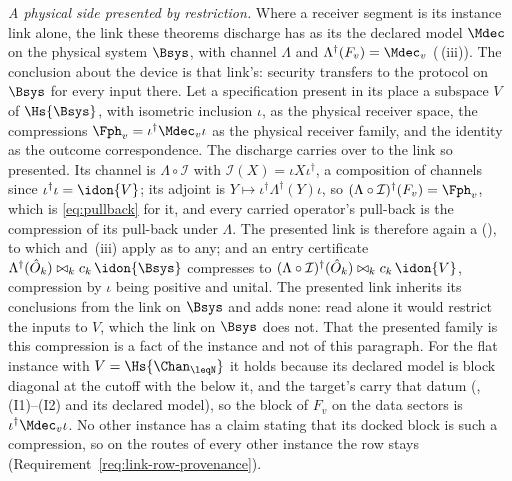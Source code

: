 \begin{remark}
\emph{A physical side presented by restriction.} Where a receiver segment is
its instance link alone, the link these theorems discharge has as its
 the declared model $\Mdec$ on the physical system
$\Bsys$, with channel $\Lambda$ and $\Lambda^{\dagger}(F_v)=\Mdec_v$
(\,(iii)). The conclusion about the device is that
link's: security transfers to the protocol on $\Bsys$ for every input there.
Let a specification present in its place a subspace $V$ of $\Hs{\Bsys}$, with
isometric inclusion $\iota$, as the physical receiver space, the compressions
$\Fph_v=\iota^{\dagger}\Mdec_v\iota$ as the physical receiver family, and the
identity as the outcome correspondence. The discharge carries over to the link
so presented. Its channel is $\Lambda\circ\mathcal{I}$ with
$\mathcal{I}(X)=\iota X\iota^{\dagger}$, a composition of channels since
$\iota^{\dagger}\iota=\idon{V}$; its adjoint is
$Y\mapsto\iota^{\dagger}\Lambda^{\dagger}(Y)\iota$, so
$(\Lambda\circ\mathcal{I})^{\dagger}(F_v)=\Fph_v$, which is
\eqref{eq:pullback} for it, and every carried operator's pull-back is the
compression of its pull-back under $\Lambda$. The presented link is therefore
again a  (), to which
 and \,(iii) apply as
to any; and an entry certificate $\Lambda^{\dagger}(\hat O_k)\bowtie_k
c_k\,\idon{\Bsys}$ compresses to $(\Lambda\circ\mathcal{I})^{\dagger}(\hat
O_k)\bowtie_kc_k\,\idon{V}$, compression by $\iota$ being positive and
unital. The presented link inherits its conclusions from the link on
$\Bsys$ and adds none: read alone it would restrict the inputs to $V$, which
the link on $\Bsys$ does not. That the presented family is this compression
is a fact of the instance and not of this paragraph. For the flat instance
with $V=\Hs{\Chan_{\leqN}}$ it holds because its declared model is block
diagonal at the cutoff with the  below it, and the target's
 carry that datum
(, (I1)--(I2) and its declared
model), so the block of $F_v$ on the data sectors is
$\iota^{\dagger}\Mdec_v\iota$. No other instance has a claim stating that its
docked block is such a compression, so on the routes of every other instance
the row stays (Requirement~\ref{req:link-row-provenance}).


\end{remark}
